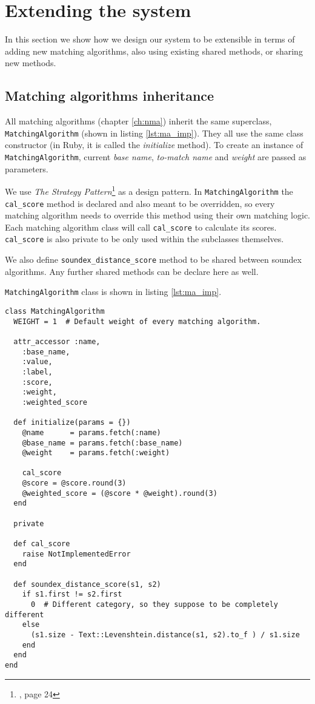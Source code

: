 \chapter{Extending the system}
\label{ch:extending}

In this section we show how we design our system to be extensible
in terms of adding new matching algorithms, also using existing
shared methods, or sharing new methods.

\section{Matching algorithms inheritance}

All matching algorithms (chapter \ref{ch:nma}) inherit the same superclass,\\
\texttt{MatchingAlgorithm} (shown in listing \ref{lst:ma_imp}). They all use the same class constructor
(in Ruby, it is called the \emph{initialize} method). To create an instance
of \texttt{MatchingAlgorithm}, current \emph{base name}, \emph{to-match name}
and \emph{weight} are passed as parameters.

We use \emph{The Strategy Pattern}\footnote{\cite[]{hf}, page 24}
as a design pattern. In \texttt{MatchingAlgorithm} the \texttt{cal\_score} method
is declared and also meant to be overridden, so every matching
algorithm needs to override this method using their own matching logic.
Each matching algorithm class will call \texttt{cal\_score}
to calculate its scores.
\texttt{cal\_score} is also private to be only used within the subclasses
themselves.

We also define \texttt{soundex\_distance\_score} method to be shared
between soundex algorithms. Any further shared methods can be declare
here as well.

\texttt{MatchingAlgorithm} class is shown in listing \ref{lst:ma_imp}.

\begin{minipage}{\linewidth}
\begin{lstlisting}[label={lst:ma_imp}, caption={\texttt{MatchingAlgorithm} class.}]
class MatchingAlgorithm
  WEIGHT = 1  # Default weight of every matching algorithm.

  attr_accessor :name,
    :base_name,
    :value,
    :label,
    :score,
    :weight,
    :weighted_score

  def initialize(params = {})
    @name      = params.fetch(:name)
    @base_name = params.fetch(:base_name)
    @weight    = params.fetch(:weight)

    cal_score
    @score = @score.round(3)
    @weighted_score = (@score * @weight).round(3)
  end

  private

  def cal_score
    raise NotImplementedError
  end

  def soundex_distance_score(s1, s2)
    if s1.first != s2.first
      0  # Different category, so they suppose to be completely different
    else
      (s1.size - Text::Levenshtein.distance(s1, s2).to_f ) / s1.size
    end
  end
end
\end{lstlisting}
\end{minipage}

